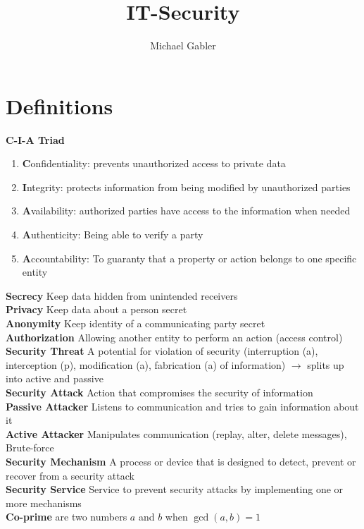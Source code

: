 \documentclass[12pt]{article}
\begin{document}
	
	
	\title{IT-Security}%
	\author{Michael Gabler} %
	
	\maketitle
	
	\section{Definitions}
	
	\textbf{C-I-A Triad}
	\begin{enumerate}
		\item \textbf{C}onfidentiality: prevents unauthorized access to private data
		\item \textbf{I}ntegrity: protects information from being modified by unauthorized parties
		\item \textbf{A}vailability: authorized parties have access to the information when needed
		\item \textbf{A}uthenticity: Being able to verify a party
		\item \textbf{A}ccountability: To guaranty that a property or action belongs to one specific entity
	\end{enumerate}
	\textbf{Secrecy} Keep data hidden from unintended receivers\\
	\textbf{Privacy} Keep data about a person secret\\
	\textbf{Anonymity} Keep identity of a communicating party secret\\
	\textbf{Authorization} Allowing another entity to perform an action (access control)\\
	\textbf{Security Threat} A potential for violation of security (interruption (a), interception (p), modification (a), fabrication (a) of information) $\rightarrow$ splits up into active and passive\\
	\textbf{Security Attack} Action that compromises the security of information\\
	\textbf{Passive Attacker} Listens to communication and tries to gain information about it\\
	\textbf{Active Attacker} Manipulates communication (replay, alter, delete messages), Brute-force\\
	\textbf{Security Mechanism} A process or device that is designed to detect, prevent or recover from a security attack\\
	\textbf{Security Service} Service to prevent security attacks by implementing one or more mechanisms\\
	\textbf{Co-prime} are two numbers $a$ and $b$ when $\gcd(a,b) = 1$
	
\end{document}
